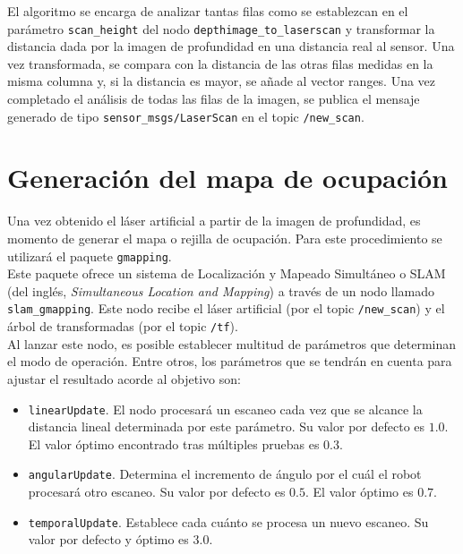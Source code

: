 El algoritmo se encarga de analizar tantas filas como se establezcan en el parámetro \texttt{scan\_height} del nodo \texttt{depthimage\_to\_laserscan} y transformar la distancia dada por la imagen de profundidad en una distancia real al sensor. Una vez transformada, se compara con la distancia de las otras filas medidas en la misma columna y, si la distancia es mayor, se añade al vector ranges. Una vez completado el análisis de todas las filas de la imagen, se publica el mensaje generado de tipo \texttt{sensor\_msgs/LaserScan} en el topic \texttt{/new\_scan}.\\

\section{Generación del mapa de ocupación}

Una vez obtenido el láser artificial a partir de la imagen de profundidad, es momento de generar el mapa o rejilla de ocupación. Para este procedimiento se utilizará el paquete \texttt{gmapping}.\\

Este paquete ofrece un sistema de Localización y Mapeado Simultáneo o SLAM (del inglés, \textit{Simultaneous Location and Mapping}) a través de un nodo llamado \texttt{slam\_gmapping}. Este nodo recibe el láser artificial (por el topic \texttt{/new\_scan}) y el árbol de transformadas (por el topic \texttt{/tf}).\\

Al lanzar este nodo, es posible establecer multitud de parámetros que determinan el modo de operación. Entre otros, los parámetros que se tendrán en cuenta para ajustar el resultado acorde al objetivo son:

\begin{itemize}

	\item \texttt{linearUpdate}. El nodo procesará un escaneo cada vez que se alcance la distancia lineal determinada por este parámetro. Su valor por defecto es $1.0$. El valor óptimo encontrado tras múltiples pruebas es $0.3$.
	\item \texttt{angularUpdate}. Determina el incremento de ángulo por el cuál el robot procesará otro escaneo. Su valor por defecto es $0.5$. El valor óptimo es $0.7$.
	\item \texttt{temporalUpdate}. Establece cada cuánto se procesa un nuevo escaneo. Su valor por defecto y óptimo es $3.0$.

\end{itemize}

